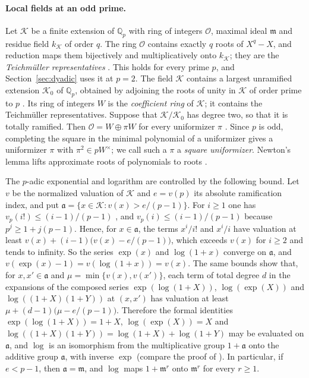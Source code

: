\documentclass[11pt]{article}
\theoremstyle{plain}
\theoremstyle{definition}
\theoremstyle{remark}
\newcommand{\Q}{\mathbb Q}
\newcommand{\OO}{\mathcal O}
\begin{document}
\paragraph{Local fields at an odd prime.}  Let $\mathcal K$ be a finite
extension of $\Q_p$ with ring of integers $\OO$, maximal ideal $\mathfrak
m$ and residue field $k_{\mathcal K}$ of order $q$.  The ring $\OO$ contains
exactly $q$ roots of $X^q-X$, and reduction maps them bijectively and
multiplicatively onto $k_{\mathcal K}$; they are the \emph{Teichmüller representatives}
\cite[Remark~7.36]{MilneANT}.  This holds for every prime $p$, and
Section~\ref{sec:dyadic} uses it at $p=2$.  The field $\mathcal K$ contains a largest
unramified extension $\mathcal K_0$ of $\Q_p$, obtained by adjoining the
roots of unity in $\mathcal K$ of order prime to $p$
\cite[Proposition~7.50 and Corollary~7.51]{MilneANT}.  Its ring of
integers $W$ is the \emph{coefficient ring} of $\mathcal K$; it contains
the Teichmüller representatives.  Suppose that $\mathcal K/\mathcal K_0$
has degree two, so that it is totally ramified.  Then
$\OO=W\oplus\pi W$ for every uniformizer $\pi$
\cite[Proposition~7.55 and Remark~7.56]{MilneANT}.  Since $p$ is odd,
completing the square in the minimal polynomial of a uniformizer gives a
uniformizer $\pi$ with $\pi^2\in pW^\times$; we call such a $\pi$ a
\emph{square uniformizer}.  Newton's lemma lifts approximate roots of
polynomials to roots \cite[Theorem~7.32]{MilneANT}.

The $p$-adic exponential and logarithm are controlled by the following
bound.  Let $v$ be the normalized valuation of $\mathcal K$ and $e=v(p)$
its absolute ramification index, and put
$\mathfrak a=\{x\in\mathcal K:v(x)>e/(p-1)\}$.  For $i\ge1$ one has
$v_p(i!)\le(i-1)/(p-1)$ \cite[Example~7.29]{MilneANT}, and
$v_p(i)\le(i-1)/(p-1)$ because $p^j\ge1+j(p-1)$.  Hence, for
$x\in\mathfrak a$, the terms $x^i/i!$ and $x^i/i$ have valuation at least
$v(x)+(i-1)\bigl(v(x)-e/(p-1)\bigr)$, which exceeds $v(x)$ for $i\ge2$
and tends to infinity.  So the series $\exp(x)$ and $\log(1+x)$ converge
on $\mathfrak a$, and $v(\exp(x)-1)=v(\log(1+x))=v(x)$.  The same bounds
show that, for $x,x'\in\mathfrak a$ and $\mu=\min\{v(x),v(x')\}$, each
term of total degree $d$ in the expansions of the composed series
$\exp(\log(1+X))$, $\log(\exp(X))$ and $\log((1+X)(1+Y))$ at $(x,x')$ has
valuation at least $\mu+(d-1)\bigl(\mu-e/(p-1)\bigr)$.  Therefore the formal
identities $\exp(\log(1+X))=1+X$, $\log(\exp(X))=X$ and
$\log((1+X)(1+Y))=\log(1+X)+\log(1+Y)$ may be evaluated on $\mathfrak a$,
and $\log$ is an isomorphism from the multiplicative group $1+\mathfrak a$
onto the additive group $\mathfrak a$, with inverse $\exp$ (compare the
proof of \cite[Chapter~III, Lemma~2.4]{MilneCFT}).  In particular, if
$e<p-1$, then $\mathfrak a=\mathfrak m$, and $\log$ maps $1+\mathfrak m^r$
onto $\mathfrak m^r$ for every $r\ge1$.
\end{document}
